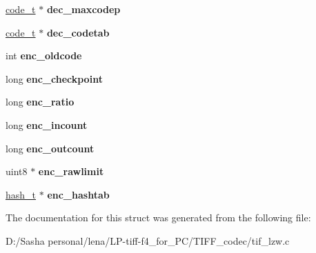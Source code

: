 \begin{DoxyCompactItemize}
\item 
\hypertarget{struct_l_z_w_codec_state_a8f123448685d87cf1a1a1daae25b6f8e}{}\hyperlink{structcode__ent}{code\+\_\+t} $\ast$ {\bfseries dec\+\_\+maxcodep}\label{struct_l_z_w_codec_state_a8f123448685d87cf1a1a1daae25b6f8e}

\item 
\hypertarget{struct_l_z_w_codec_state_a0c05a1d7f00f078e365ed8e3dd152edd}{}\hyperlink{structcode__ent}{code\+\_\+t} $\ast$ {\bfseries dec\+\_\+codetab}\label{struct_l_z_w_codec_state_a0c05a1d7f00f078e365ed8e3dd152edd}

\item 
\hypertarget{struct_l_z_w_codec_state_a4f12d682a5d3d287c7f58902ff7f31c0}{}int {\bfseries enc\+\_\+oldcode}\label{struct_l_z_w_codec_state_a4f12d682a5d3d287c7f58902ff7f31c0}

\item 
\hypertarget{struct_l_z_w_codec_state_a8f8c12c3e9be6cdbac0d5c3ccb357d61}{}long {\bfseries enc\+\_\+checkpoint}\label{struct_l_z_w_codec_state_a8f8c12c3e9be6cdbac0d5c3ccb357d61}

\item 
\hypertarget{struct_l_z_w_codec_state_af5e7f41b53c56dc77edbb4caeb3f492b}{}long {\bfseries enc\+\_\+ratio}\label{struct_l_z_w_codec_state_af5e7f41b53c56dc77edbb4caeb3f492b}

\item 
\hypertarget{struct_l_z_w_codec_state_a76246aa45abe10a45dd62bcf4ab83f74}{}long {\bfseries enc\+\_\+incount}\label{struct_l_z_w_codec_state_a76246aa45abe10a45dd62bcf4ab83f74}

\item 
\hypertarget{struct_l_z_w_codec_state_aa01766f326f0fee649ea7ca5f246fed0}{}long {\bfseries enc\+\_\+outcount}\label{struct_l_z_w_codec_state_aa01766f326f0fee649ea7ca5f246fed0}

\item 
\hypertarget{struct_l_z_w_codec_state_a09dcc78b56c2f94b017d239adecc978d}{}uint8 $\ast$ {\bfseries enc\+\_\+rawlimit}\label{struct_l_z_w_codec_state_a09dcc78b56c2f94b017d239adecc978d}

\item 
\hypertarget{struct_l_z_w_codec_state_a2b6874345d829a91784e4a40017410c9}{}\hyperlink{structhash__t}{hash\+\_\+t} $\ast$ {\bfseries enc\+\_\+hashtab}\label{struct_l_z_w_codec_state_a2b6874345d829a91784e4a40017410c9}

\end{DoxyCompactItemize}


The documentation for this struct was generated from the following file\+:\begin{DoxyCompactItemize}
\item 
D\+:/\+Sasha personal/lena/\+L\+P-\/tiff-\/f4\+\_\+for\+\_\+\+P\+C/\+T\+I\+F\+F\+\_\+codec/tif\+\_\+lzw.\+c\end{DoxyCompactItemize}
